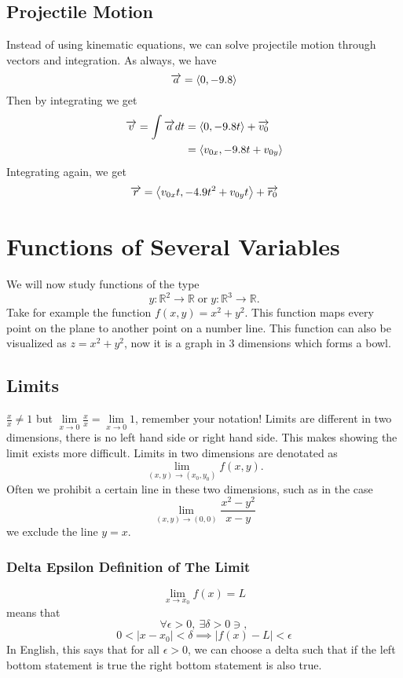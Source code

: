 \documentclass[12pt]{article}
\theoremstyle{plain} %
\theoremstyle{definition}
\theoremstyle{definition}
\theoremstyle{definition}
\theoremstyle{remark}
\newcommand{\vecr}{\vv{r}}
\newcommand{\angled}[1]{\left\langle {#1} \right\rangle}
\renewcommand\abs[1]{\left| #1 \right|}
\newcommand*{\vv}[1]{\overrightarrow{\mkern0mu#1}}
\begin{document}
\subsection{Projectile Motion}
Instead of using kinematic equations, we can solve projectile motion through vectors and integration. As always, we have
\[ \vv{a} = \angled{0,-9.8} \]
Then by integrating we get
\begin{align*}
    \vv{v} = \int{\vv{a}dt} &= \angled{0,-9.8t}+\vv{v_0} \\
    & = \angled{v_{0x},-9.8t + v_{0y}}
\end{align*}
Integrating again, we get
\[ \vecr = \angled{v_{0x}t,-4.9t^2 + v_{0y}t} + \vv{r_0} \]

\section{Functions of Several Variables}
We will now study functions of the type
\[ y:\mathbb{R}^2 \rightarrow \mathbb{R} \; \text{or} \; y:\mathbb{R}^3 \rightarrow \mathbb{R} .\]
Take for example the function $f(x,y) = x^2 + y^2$. This function maps every point on the plane to another point on a number line. This function can also be visualized as $z=x^2+y^2$, now it is a graph in $3$ dimensions which forms a bowl.
\subsection{Limits}
$\frac{x}{x} \neq 1$ but $\lim\limits_{x\rightarrow0} \frac{x}{x} = \lim\limits_{x\rightarrow0} 1$, remember your notation!
Limits are different in two dimensions, there is no left hand side or right hand side. This makes showing the limit exists more difficult. Limits in two dimensions are denotated as
\[ \lim_{(x,y)\to(x_0,y_0)} f(x,y) .\]
Often we prohibit a certain line in these two dimensions, such as in the case
\[ \lim_{(x,y)\to(0,0)} \frac{x^2-y^2}{x-y} \]
we exclude the line $y=x$.
\subsubsection{Delta Epsilon Definition of The Limit}
\[
    \lim_{x\to x_0}f(x) = L \] means that
\[ \forall \epsilon > 0,  \ \exists  \delta > 0 \ni ,\]
\[ 0 < \abs{x-x_0} < \delta \implies \abs{f(x)-L} < \epsilon \]
In English, this says that for all $\epsilon > 0$, we can choose a delta such that if the left bottom statement is true the right bottom statement is also true.
\end{document}
